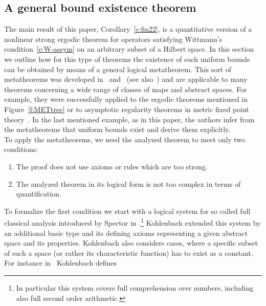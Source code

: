 \subsection{A general bound existence theorem}\label{s:Meta}

The main result of this paper, Corollary~\ref{c:fin22}, is a quantitative version
of a nonlinear strong ergodic theorem for 
operators satisfying Wittmann's condition~\eqref{e:W-assym} 
on an arbitrary subset of a Hilbert space. In this section
we outline how for this type of theorems the existence of such uniform bounds 
can be obtained by means of a general logical metatheorem. This sort of 
metatheorems was developed in~\cite{Kohlenbach05meta} and~\cite{GK08} (see also~\cite{Kohlenbach08})
and are applicable to many theorems concerning a wide range of classes of maps and abstract spaces. 
For example, they were successfully applied to 
the ergodic theorems mentioned in Figure~\ref{f:METtree} or to 
asymptotic regularity theorems in metric fixed point theory~\cite{kohlenbachleustean10}.
In the last mentioned example, as in this paper, 
the authors infer from the metatheorems that uniform bounds exist and derive them explicitly.\\
To apply the metatheorems, we need the analyzed theorem to meet only two conditions:
\begin{enumerate}
\item The proof does not use axioms or rules which are too strong.
\item The analyzed theorem in its logical form is not too complex in terms of quantification.
\end{enumerate}
To formalize the first condition we start with a logical system for so called full classical analysis
introduced by Spector in \cite{Spector62}.\footnote{In particular this system covers full comprehension
over numbers, including also full second order arithmetic.} Kohlenbach
extended this system by an additional basic type and its defining axioms representing a given abstract space
and its properties. Kohlenbach also considers cases, where a specific subset of such a space 
(or rather its characteristic function) has to exist as a constant. For instance in~\cite{Kohlenbach08} Kohlenbach defines 
